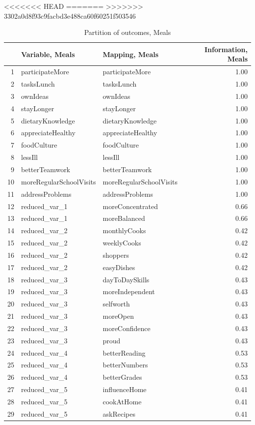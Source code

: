 \documentclass[12pt, a4paper, titlepage]{article}\usepackage[]{graphicx}\usepackage[]{color}
\begin{document}
<<<<<<< HEAD
=======
>>>>>>> 3302a0d8f93c9facbd3e488ca60f60251f503546
\begin{table}[ht]
\centering
\begin{tabular}{rllr}
  \hline
 & Variable, Meals & Mapping, Meals & Information, Meals \\ 
  \hline
1 & participateMore & participateMore & 1.00 \\ 
  2 & tasksLunch & tasksLunch & 1.00 \\ 
  3 & ownIdeas & ownIdeas & 1.00 \\ 
  4 & stayLonger & stayLonger & 1.00 \\ 
  5 & dietaryKnowledge & dietaryKnowledge & 1.00 \\ 
  6 & appreciateHealthy & appreciateHealthy & 1.00 \\ 
  7 & foodCulture & foodCulture & 1.00 \\ 
  8 & lessIll & lessIll & 1.00 \\ 
  9 & betterTeamwork & betterTeamwork & 1.00 \\ 
  10 & moreRegularSchoolVisits & moreRegularSchoolVisits & 1.00 \\ 
  11 & addressProblems & addressProblems & 1.00 \\ 
  12 & reduced\_var\_1 & moreConcentrated & 0.66 \\ 
  13 & reduced\_var\_1 & moreBalanced & 0.66 \\ 
  14 & reduced\_var\_2 & monthlyCooks & 0.42 \\ 
  15 & reduced\_var\_2 & weeklyCooks & 0.42 \\ 
  16 & reduced\_var\_2 & shoppers & 0.42 \\ 
  17 & reduced\_var\_2 & easyDishes & 0.42 \\ 
  18 & reduced\_var\_3 & dayToDaySkills & 0.43 \\ 
  19 & reduced\_var\_3 & moreIndependent & 0.43 \\ 
  20 & reduced\_var\_3 & selfworth & 0.43 \\ 
  21 & reduced\_var\_3 & moreOpen & 0.43 \\ 
  22 & reduced\_var\_3 & moreConfidence & 0.43 \\ 
  23 & reduced\_var\_3 & proud & 0.43 \\ 
  24 & reduced\_var\_4 & betterReading & 0.53 \\ 
  25 & reduced\_var\_4 & betterNumbers & 0.53 \\ 
  26 & reduced\_var\_4 & betterGrades & 0.53 \\ 
  27 & reduced\_var\_5 & influenceHome & 0.41 \\ 
  28 & reduced\_var\_5 & cookAtHome & 0.41 \\ 
  29 & reduced\_var\_5 & askRecipes & 0.41 \\ 
   \hline
\end{tabular}
\caption{Partition of outcomes, Meals} 
\end{table}
\end{document}
